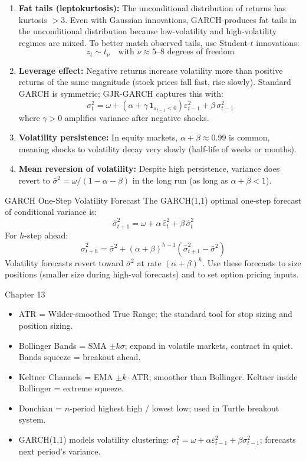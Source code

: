 \documentclass[12pt,a4paper,openany]{report}
\theoremstyle{definition}
\begin{document}
\begin{enumerate}[label=\arabic*.]
  \item \textbf{Fat tails (leptokurtosis):} The unconditional distribution of returns has kurtosis $> 3$. Even with Gaussian innovations, GARCH produces fat tails in the unconditional distribution because low-volatility and high-volatility regimes are mixed. To better match observed tails, use Student-$t$ innovations:
  \[
    z_t \sim t_\nu \quad \text{with } \nu \approx 5\text{--}8 \text{ degrees of freedom}
  \]
  \item \textbf{Leverage effect:} Negative returns increase volatility more than positive returns of the same magnitude (stock prices fall fast, rise slowly). Standard GARCH is symmetric; GJR-GARCH captures this with:
  \[
    \sigma_t^2 = \omega + (\alpha + \gamma\,\mathbf{1}_{\varepsilon_{t-1}<0})\varepsilon_{t-1}^2 + \beta\,\sigma_{t-1}^2
  \]
  where $\gamma > 0$ amplifies variance after negative shocks.
  \item \textbf{Volatility persistence:} In equity markets, $\alpha + \beta \approx 0.99$ is common, meaning shocks to volatility decay very slowly (half-life of weeks or months).
  \item \textbf{Mean reversion of volatility:} Despite high persistence, variance does revert to $\bar{\sigma}^2 = \omega/(1-\alpha-\beta)$ in the long run (as long as $\alpha + \beta < 1$).
\end{enumerate}

\begin{keyconceptbox}{GARCH One-Step Volatility Forecast}
The GARCH(1,1) optimal one-step forecast of conditional variance is:
\[
  \hat{\sigma}_{t+1}^2 = \omega + \alpha\,\hat{\varepsilon}_t^2 + \beta\,\hat{\sigma}_t^2
\]
For $h$-step ahead:
\[
  \hat{\sigma}_{t+h}^2 = \bar{\sigma}^2 + (\alpha+\beta)^{h-1}\!\left(\hat{\sigma}_{t+1}^2 - \bar{\sigma}^2\right)
\]
Volatility forecasts revert toward $\bar{\sigma}^2$ at rate $(\alpha+\beta)^h$. Use these forecasts to size positions (smaller size during high-vol forecasts) and to set option pricing inputs.
\end{keyconceptbox}

\begin{takeawaybox}{Chapter 13}
\begin{itemize}
  \item ATR = Wilder-smoothed True Range; the standard tool for stop sizing and position sizing.
  \item Bollinger Bands = SMA $\pm k\sigma$; expand in volatile markets, contract in quiet. Bands squeeze = breakout ahead.
  \item Keltner Channels = EMA $\pm k\cdot$ATR; smoother than Bollinger. Keltner inside Bollinger = extreme squeeze.
  \item Donchian = $n$-period highest high / lowest low; used in Turtle breakout system.
  \item GARCH(1,1) models volatility clustering: $\sigma_t^2 = \omega + \alpha\varepsilon_{t-1}^2 + \beta\sigma_{t-1}^2$; forecasts next period's variance.
\end{itemize}
\end{takeawaybox}
\end{document}
